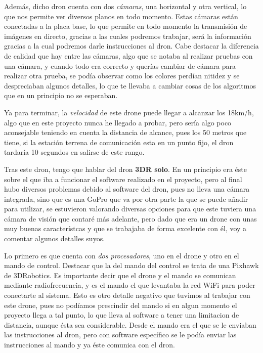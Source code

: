 \hspace{1 cm} Adem\'as, dicho dron cuenta con dos \textsl{c\'amaras}, una horizontal y otra vertical, lo que nos permite ver diversos planos en todo momento. Estas c\'amaras est\'an conectadas a la placa base, lo que permite en todo momento la transmisi\'on de im\'agenes en directo, gracias a las cuales podremos trabajar, ser\'a la informaci\'on gracias a la cual podremos darle instrucciones al dron. Cabe destacar la diferencia de calidad que hay entre las c\'amaras, algo que se notaba al realizar pruebas con una c\'amara, y cuando todo era correcto y quer\'ias cambiar de c\'amara para realizar otra prueba, se pod\'ia observar como los colores perd\'ian nitidez y se despreciaban algunos detalles, lo que te llevaba a cambiar cosas de los algoritmos que en un principio no se esperaban. 

\hspace{1 cm} Ya para terminar, la \textsl{velocidad} de este drone puede llegar a alcanzar los 18km/h, algo que en este proyecto nunca he llegado a probar, pero ser\'ia algo poco aconsejable teniendo en cuenta la distancia de alcance, pues los 50 metros que tiene, si la estaci\'on terrena de comunicaci\'on esta en un punto fijo, el dron tardar\'ia 10 segundos en salirse de este rango. 

\hspace{1 cm} Tras este dron, tengo que hablar del dron \textbf{3DR solo}. En un principio era \'este sobre el que iba a funcionar el software realizado en el proyecto, pero al final hubo diversos problemas debido al software del dron, pues no lleva una c\'amara integrada, sino que es una GoPro que va por otra parte la que se puede añadir para utilizar, se estuvieron valorando diversas opciones para que este tuviera una c\'amara de visi\'on que contar\'e m\'as adelante, pero dado que era un drone con unas muy buenas caracter\'istcas y que se trabajaba de forma excelente con \'el, voy a comentar algunos detalles suyos. 

\hspace{1 cm} Lo primero es que cuenta con \textsl{dos procesadores}, uno en el drone y otro en el mando de control. Destacar que la del mando del control se trata de una Pixhawk de 3DRobotics. Es importante decir que el drone y el mando se comunican mediante radiofrecuencia, y es el mando el que levantaba la red WiFi para poder conectarte al sistema. Esto es otro detalle negativo que tuvimos al trabajar con este drone, pues no pod\'iamos prescindir del mando si en algun momento el proyecto llega a tal punto, lo que lleva al software a tener una limitacion de distancia, aunque \'esta sea considerable. Desde el mando era el que se le enviaban las instrucciones al dron, pero con software espec\'ifico se le pod\'ia enviar las instrucciones al mando y ya \'este comunica con el dron. 

